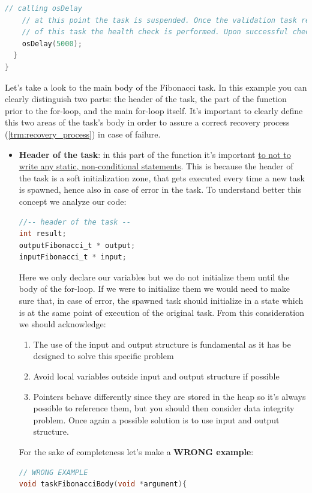 \documentclass[a4paper, 12pt]{article}
\begin{document}
\begin{onehalfspace}
\begin{enumerate}
{\begin{lstlisting}[language=C]
    // calling osDelay
    // at this point the task is suspended. Once the validation task reaches the same point in execution
    // of this task the health check is performed. Upon successful check, commit function taskFibonacci is executed.
    osDelay(5000);
  }
}      
    \end{lstlisting}
    Let's take a look to the main body of the Fibonacci task. In this example you can clearly distinguish two parts: the header of the task, the part of the function prior to the for-loop, and the main for-loop itself. It's important to clearly define this two areas of the task's body in order to assure a correct recovery process (\ref{trm:recovery_process}) in case of failure.
    \begin{itemize}
        \item {\textbf{Header of the task}: in this part of the function it's important \underline{to not to} \underline{write any static, non-conditional statements}. This is because the header of the task is a soft initialization zone, that gets executed every time a new task is spawned, hence also in case of error in the task. To understand better this concept we analyze our code:
        \begin{lstlisting}[language=C]
//-- header of the task --
int result;
outputFibonacci_t * output;
inputFibonacci_t * input;        
        \end{lstlisting}
        Here we only declare our variables but we do not initialize them until the body of the for-loop. If we were to initialize them we would need to make sure that, in case of error, the spawned task should initialize in a state which is at the same point of execution of the original task. From this consideration we should acknowledge:
        \begin{enumerate}
            \item The use of the input and output structure is fundamental as it has be designed to solve this specific problem
            \item Avoid local variables outside input and output structure if possible
            \item Pointers behave differently since they are stored in the heap so it's always possible to reference them, but you should then consider data integrity problem. Once again a possible solution is to use input and output structure.
        \end{enumerate}
        For the sake of completeness let's make a \textbf{WRONG example}:
            \begin{lstlisting}[language=C]
// WRONG EXAMPLE
void taskFibonacciBody(void *argument){


\end{lstlisting}}
\end{itemize}}
\end{enumerate}
\end{onehalfspace}
\end{document}
